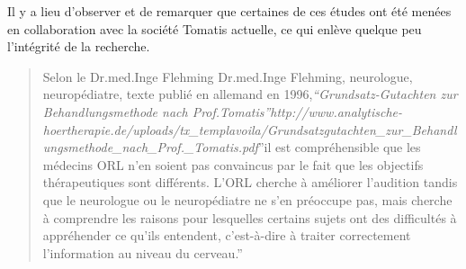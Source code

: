 \documentclass[12pt,french]{report}
\makeatletter
\let\SF@@footnote\footnote
\def\footnote{\ifx\protect\@typeset@protect
    \expandafter\SF@@footnote
  \else
    \expandafter\SF@gobble@opt
  \fi
}
\edef\SF@gobble@opt{\noexpand\protect
  \expandafter\noexpand\csname SF@gobble@opt \endcsname}
\makeatother
\begin{document}
Il y a lieu d'observer et de remarquer que certaines de ces études
ont été menées en collaboration avec la société Tomatis actuelle,
ce qui enlève quelque peu l'intégrité de la recherche.
\begin{quotation}
Selon le Dr.med.Inge Flehming\footnote{Dr.med.Inge Flehming, neurologue, neuropédiatre, texte publié en allemand
en 1996,\emph{``Grundsatz-Gutachten zur Behandlungsmethode nach Prof.Tomatis''http://www.analytische-hoertherapie.de/uploads/tx\_templavoila/Grundsatzgutachten\_zur\_Behandlungsmethode\_nach\_Prof.\_Tomatis.pdf}}''il est compréhensible que les médecins ORL n'en soient pas convaincus
par le fait que les objectifs thérapeutiques sont différents. L'ORL
cherche à améliorer l'audition tandis que le neurologue ou le neuropédiatre
ne s'en préoccupe pas, mais cherche à comprendre les raisons pour
lesquelles certains sujets ont des difficultés à appréhender ce qu'ils
entendent, c'est-à-dire à traiter correctement l'information au niveau
du cerveau.''
\end{quotation}
\end{document}
